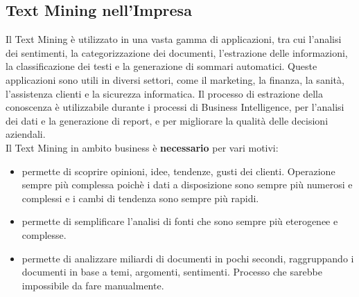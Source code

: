 \documentclass{report}
\begin{document}
	\subsection{Text Mining nell'Impresa}
	Il Text Mining è utilizzato in una vasta gamma di applicazioni, tra cui l'analisi dei sentimenti, la categorizzazione dei documenti, l'estrazione delle informazioni, la classificazione dei testi e la generazione di sommari automatici. Queste applicazioni sono utili in diversi settori, come il marketing, la finanza, la sanità, l'assistenza clienti e la sicurezza informatica. Il processo di estrazione della conoscenza è utilizzabile durante i processi di Business Intelligence, per l'analisi dei dati e la generazione di report, e per migliorare la qualità delle decisioni aziendali.
	\vspace{\baselineskip}\\
	Il Text Mining in ambito business è \textbf{necessario} per vari motivi:
	\begin{itemize}
		\item permette di scoprire opinioni, idee, tendenze, gusti dei clienti. Operazione sempre più complessa poichè i dati a disposizione sono sempre più numerosi e complessi e i cambi di tendenza sono sempre più rapidi.
		\item permette di semplificare l'analisi di fonti che sono sempre più eterogenee e complesse.
		\item permette di analizzare miliardi di documenti in pochi secondi, raggruppando i documenti in base a temi, argomenti, sentimenti. Processo che sarebbe impossibile da fare manualmente.
	\end{itemize}
\end{document}
